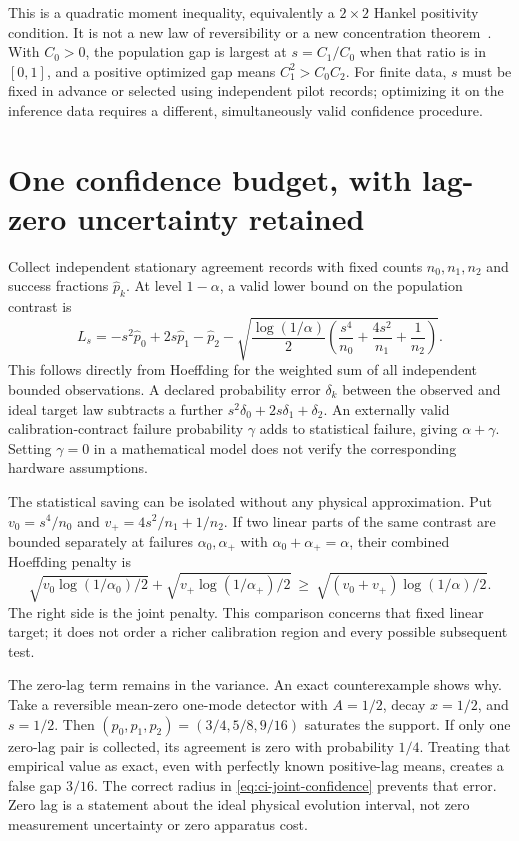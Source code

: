 This is a quadratic moment inequality, equivalently a $2\times2$ Hankel
positivity condition. It is not a new law of reversibility or a new
concentration theorem~\cite{vlAldousFill2002,caHoeffding1963}.
With $C_0>0$, the population gap is largest at $s=C_1/C_0$ when that ratio is
in $[0,1]$, and a positive optimized gap means $C_1^2>C_0C_2$.
For finite data, $s$ must be fixed in advance or selected using independent
pilot records; optimizing it on the inference data requires a different,
simultaneously valid confidence procedure.

\section{One confidence budget, with lag-zero uncertainty retained}
Collect independent stationary agreement records with fixed counts
$n_0,n_1,n_2$ and success fractions $\widehat p_k$. At level $1-\alpha$, a
valid lower bound on the population contrast is
\begin{equation}
 L_s=-s^2\widehat p_0+2s\widehat p_1-\widehat p_2
 -\sqrt{\frac{\log(1/\alpha)}2
       \left(\frac{s^4}{n_0}+\frac{4s^2}{n_1}+\frac1{n_2}\right)}.
 \label{eq:ci-joint-confidence}
\end{equation}
This follows directly from Hoeffding for the weighted sum of all independent
bounded observations. A declared probability error $\delta_k$ between the
observed and ideal target law subtracts a further
$s^2\delta_0+2s\delta_1+\delta_2$. An externally valid calibration-contract
failure probability $\gamma$ adds to statistical failure, giving
$\alpha+\gamma$. Setting $\gamma=0$ in a mathematical model does not verify
the corresponding hardware assumptions.

The statistical saving can be isolated without any physical approximation.
Put $v_0=s^4/n_0$ and $v_+=4s^2/n_1+1/n_2$. If two linear parts of the same
contrast are bounded separately at failures $\alpha_0,\alpha_+$ with
$\alpha_0+\alpha_+=\alpha$, their combined Hoeffding penalty is
\[
 \sqrt{v_0\log(1/\alpha_0)/2}
 +\sqrt{v_+\log(1/\alpha_+)/2}
 \ \geq\ \sqrt{(v_0+v_+)\log(1/\alpha)/2}.
\]
The right side is the joint penalty. This comparison concerns that fixed
linear target; it does not order a richer calibration region and every
possible subsequent test.

The zero-lag term remains in the variance. An exact counterexample shows why.
Take a reversible mean-zero one-mode detector with
$A=1/2$, decay $x=1/2$, and $s=1/2$. Then
$(p_0,p_1,p_2)=(3/4,5/8,9/16)$ saturates the support. If only one zero-lag
pair is collected, its agreement is zero with probability $1/4$. Treating
that empirical value as exact, even with perfectly known positive-lag means,
creates a false gap $3/16$. The correct radius in
\eqref{eq:ci-joint-confidence} prevents that error. Zero lag is a statement
about the ideal physical evolution interval, not zero measurement uncertainty
or zero apparatus cost.

